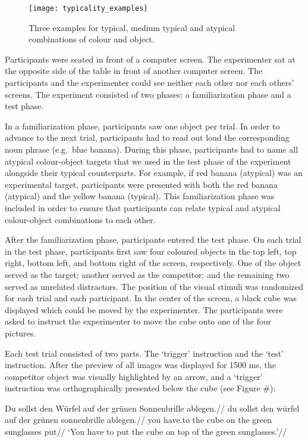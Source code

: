 \documentclass[
]{article}
\begin{document}
\begin{figure}[tbp]

{\centering \texttt{[image: typicality\_examples]} 

}

\caption{Three examples for typical, medium typical and atypical combinations of colour and object.}\label{fig:image0}
\end{figure}

Participants were seated in front of a computer screen. The experimenter
sat at the opposite side of the table in front of another computer
screen. The participants and the experimenter could see neither each
other nor each others' screens. The experiment consisted of two phases:
a familiarization phase and a test phase.

In a familiarization phase, participants saw one object per trial. In
order to advance to the next trial, participants had to read out loud
the corresponding noun phrase (e.g.~blue banana). During this phase,
participants had to name all atypical colour-object targets that we used
in the test phase of the experiment alongside their typical
counterparts. For example, if red banana (atypical) was an experimental
target, participants were presented with both the red banana (atypical)
and the yellow banana (typical). This familiarization phase was included
in order to ensure that participants can relate typical and atypical
colour-object combinations to each other.

After the familiarization phase, participants entered the test phase. On
each trial in the test phase, participants first saw four coloured
objects in the top left, top right, bottom left, and bottom right of the
screen, respectively. One of the object served as the target; another
served as the competitor; and the remaining two served as unrelated
distractors. The position of the visual stimuli was randomized for each
trial and each participant. In the center of the screen, a black cube
was displayed which could be moved by the experimenter. The participants
were asked to instruct the experimenter to move the cube onto one of the
four pictures.

Each test trial consisted of two parts. The `trigger' instruction and
the `test' instruction. After the preview of all images was displayed
for 1500 ms, the competitor object was visually highlighted by an arrow,
and a `trigger' instruction was orthographically presented below the
cube (see Figure \#):

\ex \begingl
\glpreamble Du sollst den Würfel auf der grünen Sonnenbrille ablegen.//
\gla du sollst den würfel auf der grünen sonnenbrille ablegen.//
\glb you have.to the cube on the green sunglasses put//
\glft `You have to put the cube on top of the green sunglasses.'//
\endgl \xe
\end{document}
